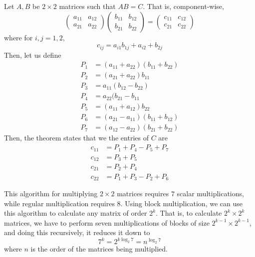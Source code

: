 \documentclass{article}
\begin{document}
    \begin{theorem}
    Let $A, B$ be $2 \times 2$ matrices such that $AB = C$. That is, component-wise,
    \[\begin{pmatrix}
    a_{11} & a_{12} \\ a_{21} & a_{22}
    \end{pmatrix} \begin{pmatrix}
    b_{11} & b_{12} \\ b_{21} & b_{22}
    \end{pmatrix}
     = \begin{pmatrix}
      c_{11} & c_{12} \\ c_{21} & c_{22}
     \end{pmatrix}\]
    where for $i, j = 1, 2$, 
    \[c_{ij} = a_{i1} b_{1j} + a_{i2} + b_{2j}\]
    Then, let us define 
    \begin{align*}
        P_1 &= (a_{11} + a_{22}) (b_{11} + b_{22}) \\
        P_2 &= (a_{21} + a_{22}) b_{11} \\
        P_3 &= a_{11} (b_{12} - b_{22}) \\
        P_4 &= a_{22} (b_{21} - b_{11} \\
        P_5 &= (a_{11} + a_{12}) b_{22} \\
        P_6 &= (a_{21} - a_{11}) (b_{11} + b_{12}) \\
        P_7 &= (a_{12} - a_{22}) (b_{21} + b_{22}) 
    \end{align*}
    Then, the theorem states that we the entries of $C$ are 
    \begin{align*}
        c_{11} &= P_1 + P_4 - P_5 + P_7 \\
        c_{12} &= P_3 + P_5 \\
        c_{21} &= P_2 + P_4 \\
        c_{22} &= P_1 + P_3 - P_2 + P_6
    \end{align*}
    \end{theorem}

    This algorithm for multiplying $2\times 2$ matrices requires $7$ scalar multiplications, while regular multiplication requires $8$. Using block multiplication, we can use this algorithm to calculate any matrix of order $2^k$. That is, to calculate $2^k \times 2^k$ matrices, we have to perform seven multiplications of blocks of size $2^{k-1} \times 2^{k-1}$, and doing this recursively, it reduces it down to 
    \[7^k = 2^{k \log_2{7}} = n^{\log_2{7}}\]
    where $n$ is the order of the matrices being multiplied. 
\end{document}
